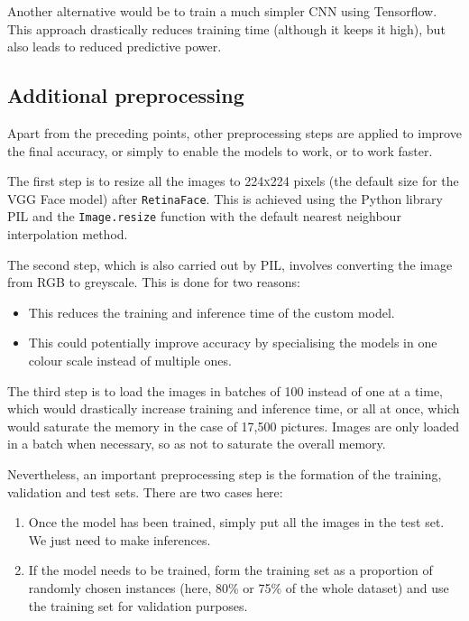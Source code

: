 \documentclass[9pt,twocolumn,twoside]{ilcss}
\theoremstyle{definition}
\theoremstyle{remark}
\theoremstyle{definition}
\theoremstyle{definition}
\begin{document}
        Another alternative would be to train a much simpler CNN using Tensorflow. This approach drastically reduces training time (although it keeps it high), but also leads to reduced predictive power.

    \subsection{Additional preprocessing}
        Apart from the preceding points, other preprocessing steps are applied to improve the final accuracy, or simply to enable the models to work, or to work faster.

        The first step is to resize all the images to \textsc{224x224} pixels (the default size for the VGG Face model) after \texttt{RetinaFace}. This is achieved using the Python library PIL and the \texttt{Image.resize} function with the default nearest neighbour interpolation method.

        The second step, which is also carried out by PIL, involves converting the image from RGB to greyscale. This is done for two reasons:
        \begin{itemize}[noitemsep,parsep=0pt,partopsep=0pt]
            \item This reduces the training and inference time of the custom model.
            \item This could potentially improve accuracy by specialising the models in one colour scale instead of multiple ones.
        \end{itemize}

        The third step is to load the images in batches of 100 instead of one at a time, which would drastically increase training and inference time, or all at once, which would saturate the memory in the case of 17,500 pictures. Images are only loaded in a batch when necessary, so as not to saturate the overall memory.

        Nevertheless, an important preprocessing step is the formation of the training, validation and test sets. There are two cases here:
        \begin{enumerate}[noitemsep,parsep=0pt,partopsep=0pt]
            \item Once the model has been trained, simply put all the images in the test set. We just need to make inferences.
            \item If the model needs to be trained, form the training set as a proportion of randomly chosen instances (here, 80\% or 75\% of the whole dataset) and use the training set for validation purposes.
        \end{enumerate}
\end{document}
